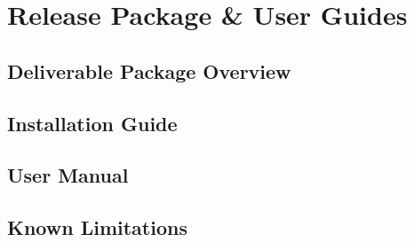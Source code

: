 \chapter{Release Package \& User Guides}

\section{Deliverable Package Overview}

\section{Installation Guide}

\section{User Manual}

\section{Known Limitations}
